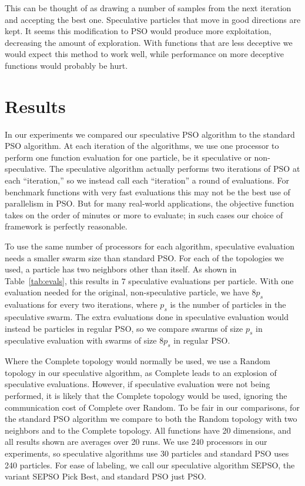 \documentclass[oneside,honors]{honors}
\begin{document}
This can be thought of as drawing a number of samples from the next iteration
and accepting the best one.  Speculative particles that move in good directions
are kept.  It seems this modification to PSO would produce more exploitation,
decreasing the amount of exploration.  With functions that are less deceptive
we would expect this method to work well, while performance on more deceptive
functions would probably be hurt.

\section{Results}
\label{sec:results}

In our experiments we compared our speculative PSO algorithm to the standard
PSO algorithm.  At each iteration of the algorithms, we use one processor to
perform one function evaluation for one particle, be it speculative or
non-speculative.  The speculative algorithm actually performs two iterations of
PSO at each ``iteration,'' so we instead call each ``iteration'' a round of
evaluations.  For benchmark functions with very fast evaluations this may not
be the best use of parallelism in PSO.  But for many real-world applications,
the objective function takes on the order of minutes or more to evaluate; in
such cases our choice of framework is perfectly reasonable.

To use the same number of processors for each algorithm, speculative evaluation
needs a smaller swarm size than standard PSO.  For each of the topologies we
used, a particle has two neighbors other than itself.  As shown in
Table~\ref{tab:evals}, this results in $7$ speculative evaluations per
particle.  With one evaluation needed for the original, non-speculative
particle, we have $8p_s$ evaluations for every two iterations, where $p_s$ is
the number of particles in the speculative swarm.  The extra evaluations done
in speculative evaluation would instead be particles in regular PSO, so we
compare swarms of size $p_s$ in speculative evaluation with swarms of size
$8p_s$ in regular PSO.

Where the Complete topology would normally be used, we use a Random topology in
our speculative algorithm, as Complete leads to an explosion of speculative
evaluations.  However, if speculative evaluation were not being performed, it
is likely that the Complete topology would be used, ignoring the communication
cost of Complete over Random.  To be fair in our comparisons, for the standard
PSO algorithm we compare to both the Random topology with two neighbors and to
the Complete topology.  All functions have 20 dimensions, and all results shown
are averages over 20 runs.  We use 240 processors in our experiments, so
speculative algorithms use 30 particles and standard PSO uses 240 particles.
For ease of labeling, we call our speculative algorithm SEPSO, the variant
SEPSO Pick Best, and standard PSO just PSO.
\end{document}
